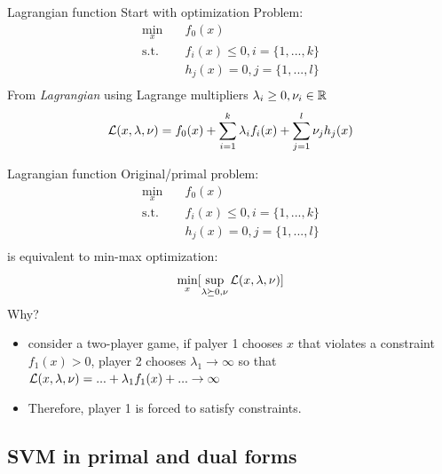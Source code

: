 \documentclass[draft]{beamer}
\begin{document}
\begin{frame}{Lagrangian function} 
	Start with optimization Problem: 
	\begin{equation}
		\begin{aligned}
			\min_x \quad & f_0(x)  \\ 
			\textrm{s.t.} \quad & f_i(x) \le 0, i = \{1,...,k\} \\  
					 \quad & h_j(x) = 0, j = \{1,...,l\} \\ 
		\end{aligned}
	\end{equation}
	From \emph{Lagrangian} using Lagrange multipliers $\lambda_i \ge 0, \nu_i \in {\mathbb{R}}$ 
	\begin{equation}
		\mathcal{L}(x,\lambda,\nu) = f_0(x)+\sum_{i=1}^{k} \lambda_i f_i(x) + \sum_{j=1}^{l} \nu_j h_j (x) 
	\end{equation}
\end{frame}

\begin{frame}
	{Lagrangian function}
	Original/primal problem: 
	\begin{equation*}
		\begin{aligned}
			\min_x \quad & f_0(x)  \\ 
			\textrm{s.t.} \quad & f_i(x) \le 0, i = \{1,...,k\} \\  
					 \quad & h_j(x) = 0, j = \{1,...,l\} \\ 
		\end{aligned}
	\end{equation*}
	is equivalent to min-max optimization: 
	\[\min_x [\sup_{\lambda \succeq 0, \nu} \mathcal{L}(x,\lambda, \nu)] \] 
	Why? 
	\pause
	\begin{itemize}
		\item consider a two-player game, if palyer 1 chooses $x$ that violates a constraint $f_1(x)>0$, player 2 chooses $\lambda_1 \rightarrow \infty$ so that $\mathcal{L} (x,\lambda,\nu)=...+\lambda_1 f_1(x)+... \rightarrow \infty $
		\item Therefore, player 1 is forced to satisfy constraints. 
	\end{itemize}
\end{frame}

\subsection{SVM in primal and dual forms}
\end{document}
